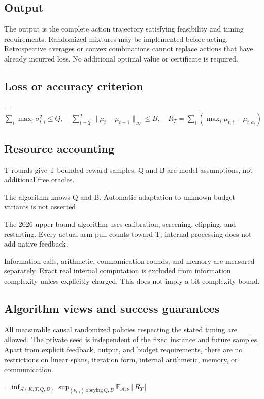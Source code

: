 \documentclass[10pt,a4paper]{article}
\newcommand{\AtlasMath}[1]{\par\begingroup\centering\setbox0=\hbox{$\displaystyle #1$}\ifdim\wd0>1.4\linewidth\typeout{ATLAS WIDE FORMULA: \the\wd0}\fi\ifdim\wd0>\linewidth\resizebox{\linewidth}{!}{\box0}\else\box0\fi\par\endgroup}
\begin{document}
\subsection{Output}
The output is the complete action trajectory satisfying feasibility and timing requirements. Randomized mixtures may be implemented before acting. Retrospective averages or convex combinations cannot replace actions that have already incurred loss. No additional optimal value or certificate is required.

\subsection{Loss or accuracy criterion}

\AtlasMath{\sum_t\max_i\sigma_{t,i}^2\le Q,\quad\sum_{t=2}^T\|\mu_t-\mu_{t-1}\|_\infty\le B,\quad R_T=\sum_t(\max_i\mu_{t,i}-\mu_{t,a_t})}


\subsection{Resource accounting}
T rounds give T bounded reward samples. Q and B are model assumptions, not additional free oracles.

The algorithm knows Q and B. Automatic adaptation to unknown-budget variants is not asserted.

The 2026 upper-bound algorithm uses calibration, screening, clipping, and restarting. Every actual arm pull counts toward T; internal processing does not add native feedback.

Information calls, arithmetic, communication rounds, and memory are measured separately. Exact real internal computation is excluded from information complexity unless explicitly charged. This does not imply a bit-complexity bound.

\subsection{Algorithm views and success guarantees}
All measurable causal randomized policies respecting the stated timing are allowed. The private seed is independent of the fixed instance and future samples. Apart from explicit feedback, output, and budget requirements, there are no restrictions on linear spans, iteration form, internal arithmetic, memory, or communication.


\AtlasMath{\inf_{\mathcal{A}(K,T,Q,B)}\sup_{(\nu_{t,i})\ \mathrm{obeying}\ Q,B}\mathbb{E}_{\mathcal{A},\nu}[R_T]}
\end{document}
